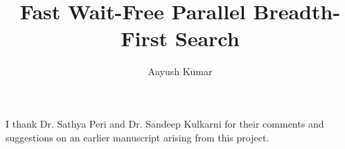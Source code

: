\documentclass[sigconf,nonacm]{acmart}
\title{Fast Wait-Free Parallel Breadth-First Search}
\author{Aayush Kumar}
\theoremstyle{definition}
\begin{document}
\maketitle












\begin{acks}
I thank Dr. Sathya Peri and Dr. Sandeep Kulkarni for their comments and suggestions on an earlier manuscript arising from this project.
\end{acks}





\end{document}
